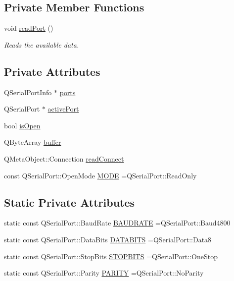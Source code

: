 \subsection*{Private Member Functions}
\begin{DoxyCompactItemize}
\item 
void \hyperlink{class_serial_port_a708a04f46660c9803112fda4f60defe1}{read\-Port} ()
\begin{DoxyCompactList}\small\item\em Reads the available data. \end{DoxyCompactList}\end{DoxyCompactItemize}
\subsection*{Private Attributes}
\begin{DoxyCompactItemize}
\item 
Q\-Serial\-Port\-Info $\ast$ \hyperlink{class_serial_port_aead0028dd7ba1073c5a0cf6f1775106b}{ports}
\item 
Q\-Serial\-Port $\ast$ \hyperlink{class_serial_port_abf454cb55d0053b354080a0dd6a43800}{active\-Port}
\item 
bool \hyperlink{class_serial_port_ab4a0ae7dd5d94991088247289935424d}{is\-Open}
\item 
Q\-Byte\-Array \hyperlink{class_serial_port_af5ff5c504f070840bd28ee371f353f05}{buffer}
\item 
Q\-Meta\-Object\-::\-Connection \hyperlink{class_serial_port_a63896cd014af7968402b8e7f051f24b3}{read\-Connect}
\item 
const Q\-Serial\-Port\-::\-Open\-Mode \hyperlink{class_serial_port_a92c94e506ac3ae86ea1e787c0d7b138f}{M\-O\-D\-E} =Q\-Serial\-Port\-::\-Read\-Only
\end{DoxyCompactItemize}
\subsection*{Static Private Attributes}
\begin{DoxyCompactItemize}
\item 
static const Q\-Serial\-Port\-::\-Baud\-Rate \hyperlink{class_serial_port_af5e3812b185f5f72c3ac1c298497694b}{B\-A\-U\-D\-R\-A\-T\-E} =Q\-Serial\-Port\-::\-Baud4800
\item 
static const Q\-Serial\-Port\-::\-Data\-Bits \hyperlink{class_serial_port_a74455f210ee1c4704daf3347b7d2b088}{D\-A\-T\-A\-B\-I\-T\-S} =Q\-Serial\-Port\-::\-Data8
\item 
static const Q\-Serial\-Port\-::\-Stop\-Bits \hyperlink{class_serial_port_a52f45df73cda27a0c096ddbfa53ff025}{S\-T\-O\-P\-B\-I\-T\-S} =Q\-Serial\-Port\-::\-One\-Stop
\item 
static const Q\-Serial\-Port\-::\-Parity \hyperlink{class_serial_port_afb8f52adfc0898451eb78eb5961b125c}{P\-A\-R\-I\-T\-Y} =Q\-Serial\-Port\-::\-No\-Parity
\end{DoxyCompactItemize}


